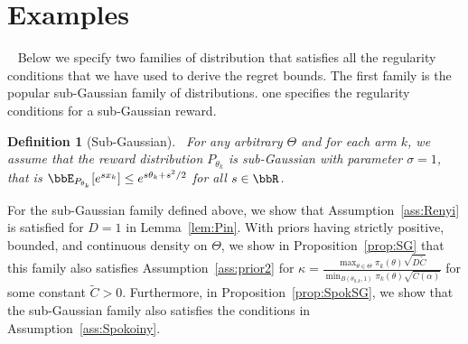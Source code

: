 \documentclass[11pt]{article}
\newtheorem{definition}[theorem]{Definition}
\begin{document}
\section{Examples}~\label{sec:Exam}
Below we specify two families of distribution that satisfies all the regularity conditions that we have used to derive the regret bounds.  The first family is the popular sub-Gaussian family of distributions. one specifies the regularity conditions for a sub-Gaussian reward. \begin{definition}[Sub-Gaussian]~\label{def:SubReward}
   For any arbitrary $\Theta$ and for each arm $k$, we assume that
    the reward distribution $P_{\theta_k}$ is sub-Gaussian with parameter $\sigma=1$, that is $\bbE_{P_{\theta_k}} [e^{s x_k}] \leq e^{s \theta_k + s^2/2}$ for all $s\in \bbR$.
    \end{definition}
    For the sub-Gaussian family defined above, we show that Assumption~\ref{ass:Renyi} is satisfied for $D=1$ in Lemma~\ref{lem:Pin}. With priors having strictly positive, bounded,  and continuous density on $\Theta$, we show in Proposition~\ref{prop:SG} that this family also satisfies Assumption~\ref{ass:prior2} for $\kappa= \frac{\max_{\theta\in\Theta} \pi_k(\theta) \sqrt{D\tilde{C}}}{\min_{B(\theta_{0,k},1)} \pi_k(\theta) \sqrt{C(\alpha)}}$ for some constant $\tilde{C}>0$. Furthermore, in Proposition~\ref{prop:SpokSG}, we show that the sub-Gaussian family also satisfies the conditions in Assumption~\ref{ass:Spokoiny}. 
\end{document}
